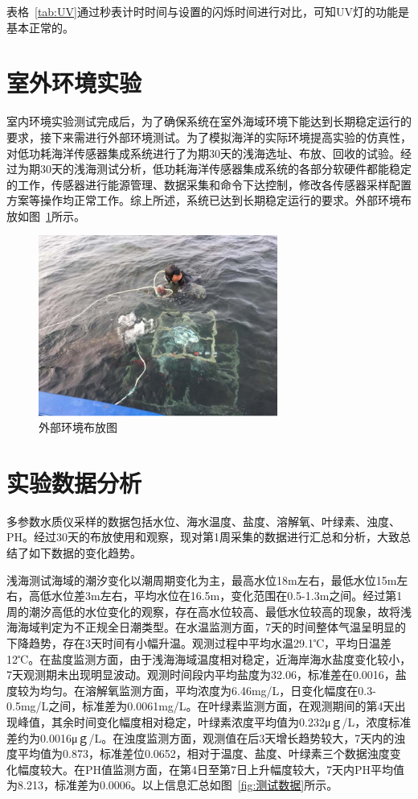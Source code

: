 表格~\ref{tab:UV}通过秒表计时时间与设置的闪烁时间进行对比，可知UV灯的功能是基本正常的。
\section{室外环境实验}
室内环境实验测试完成后，为了确保系统在室外海域环境下能达到长期稳定运行的要求，接下来需进行外部环境测试。为了模拟海洋的实际环境提高实验的仿真性，对低功耗海洋传感器集成系统进行了为期30天的浅海选址、布放、回收的试验。经过为期30天的浅海测试分析，低功耗海洋传感器集成系统的各部分软硬件都能稳定的工作，传感器进行能源管理、数据采集和命令下达控制，修改各传感器采样配置方案等操作均正常工作。综上所述，系统已达到长期稳定运行的要求。外部环境布放如图~\ref{fig:外部环境测试效果图}所示。

\begin{figure}[ht]
    \centering
	\includegraphics[width=0.7\textwidth]{fig/外部环境测试效果图.png}
	\caption{外部环境布放图}
	\label{fig:外部环境测试效果图}
\end{figure}

\section{实验数据分析}
多参数水质仪采样的数据包括水位、海水温度、盐度、溶解氧、叶绿素、浊度、PH。经过30天的布放使用和观察，现对第1周采集的数据进行汇总和分析，大致总结了如下数据的变化趋势。

浅海测试海域的潮汐变化以潮周期变化为主，最高水位18m左右，最低水位15m左右，高低水位差3m左右，平均水位在16.5m，变化范围在0.5-1.3m之间。经过第1 周的潮汐高低的水位变化的观察，存在高水位较高、最低水位较高的现象，故将浅海海域判定为不正规全日潮类型。在水温监测方面，7天的时间整体气温呈明显的下降趋势，存在3天时间有小幅升温。观测过程中平均水温29.1℃，平均日温差 12℃。在盐度监测方面，由于浅海海域温度相对稳定，近海岸海水盐度变化较小，7天观测期未出现明显波动。观测时间段内平均盐度为32.06，标准差在0.0016，盐度较为均匀。在溶解氧监测方面，平均浓度为6.46mg/L，日变化幅度在0.3-0.5mg/L之间，标准差为0.0061mg/L。在叶绿素监测方面，在观测期间的第4天出现峰值，其余时间变化幅度相对稳定，叶绿素浓度平均值为0.232μｇ/L，浓度标准差约为0.0016μｇ/L。在浊度监测方面，观测值在后3天增长趋势较大，7天内的浊度平均值为0.873，标准差位0.0652，相对于温度、盐度、叶绿素三个数据浊度变化幅度较大。在PH值监测方面，在第4日至第7日上升幅度较大，7天内PH平均值为8.213，标准差为0.0006。以上信息汇总如图~\ref{fig:测试数据}所示。

